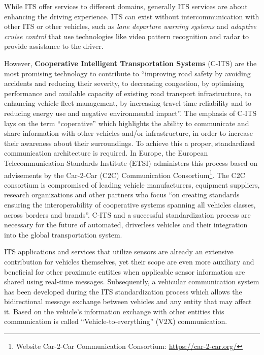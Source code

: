 While ITS offer services to different domains, generally ITS services are about enhancing the driving experience. ITS can exist without intercommunication with other ITS or other vehicles, such as \textit{lane departure warning systems} and \textit{adaptive cruise control} that use technologies like video pattern recognition and radar to provide assistance to the driver. \cite{} %


However, \textbf{Cooperative Intelligent Transportation Systems} (C-ITS) are the most promising technology to contribute to ``improving road safety by avoiding accidents and reducing their severity, to decreasing congestion, by optimising performance and available capacity of existing road transport infrastructure, to enhancing vehicle fleet management, by increasing travel time reliability and to reducing energy use and negative environmental impact''.
The emphasis of C-ITS lays on the term ``coperative'' which highlights the ability to communicate and share information with other vehicles and/or infrastructure, in order to increase their awareness about their surroundings.
To achieve this a proper, standardized communication architecture is required. In Europe, the European Telecommunication Standards Institute (ETSI) administers this process based on advisements by the Car-2-Car (C2C) Communication Consortium\footnote{Website Car-2-Car Communication Consortium: \url{https://car-2-car.org/}}.
The C2C consortium is compromised of leading vehicle manufacturers, equipment suppliers, research organizations and other partners who focus ``on creating standards ensuring the interoperability of cooperative systems spanning all vehicles classes, across borders and brands''\cite{}. %
C-ITS and a successful standardization process are necessary for the future of automated, driverless vehicles and their integration into the global transportation system.

ITS applications and services that utilize sensors are already an extensive contribution for vehicles themselves, yet their scope are even more auxiliary and beneficial for other proximate entities when applicable sensor information are shared using real-time messages.
Subsequently, a vehicular communication system has been developed during the ITS standardization process which allows the bidirectional message exchange between vehicles and any entity that may affect it.
Based on the vehicle's information exchange with other entities this communication is called ``Vehicle-to-everything'' (V2X) communication.

